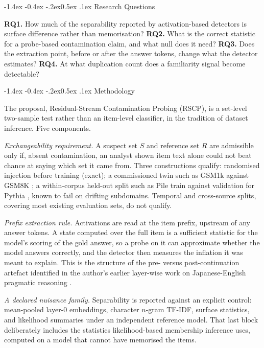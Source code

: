 \documentclass[10pt,letterpaper]{article}
\makeatletter
\renewcommand\section{\@startsection{section}{1}{\z@}%
  {-1.4ex \@plus -0.4ex \@minus -.2ex}{0.5ex \@plus .1ex}%
  {\normalfont\normalsize\bfseries}}
\makeatother
\begin{document}
\section{Research Questions}

\textbf{RQ1.} How much of the separability reported by activation-based detectors is surface difference rather than memorisation? \textbf{RQ2.} What is the correct statistic for a probe-based contamination claim, and what null does it need? \textbf{RQ3.} Does the extraction point, before or after the answer tokens, change what the detector estimates? \textbf{RQ4.} At what duplication count does a familiarity signal become detectable?

\section{Methodology}

The proposal, Residual-Stream Contamination Probing (RSCP), is a set-level two-sample test rather than an item-level classifier, in the tradition of dataset inference. Five components.

\textit{Exchangeability requirement.} A suspect set $S$ and reference set $R$ are admissible only if, absent contamination, an analyst shown item text alone could not beat chance at saying which set it came from. Three constructions qualify: randomised injection before training (exact); a commissioned twin such as GSM1k against GSM8K \cite{zhang2024gsm1k}; a within-corpus held-out split such as Pile train against validation for Pythia \cite{biderman2023pythia}, known to fail on drifting subdomains. Temporal and cross-source splits, covering most existing evaluation sets, do not qualify.

\textit{Prefix extraction rule.} Activations are read at the item prefix, upstream of any answer tokens. A state computed over the full item is a sufficient statistic for the model's scoring of the gold answer, so a probe on it can approximate whether the model answers correctly, and the detector then measures the inflation it was meant to explain. This is the structure of the pre- versus post-continuation artefact identified in the author's earlier layer-wise work on Japanese-English pragmatic reasoning \cite{braun2026crosslingual}.

\textit{A declared nuisance family.} Separability is reported against an explicit control: mean-pooled layer-0 embeddings, character $n$-gram TF-IDF, surface statistics, and likelihood summaries under an independent reference model. That last block deliberately includes the statistics likelihood-based membership inference uses, computed on a model that cannot have memorised the items.
\end{document}
